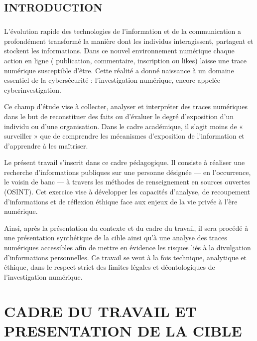 \documentclass[memoire,12pt]{report}
\begin{document}
\section*{INTRODUCTION}
\paragraph{}
L'évolution rapide des technologies de l'information et de la communication a profondément transformé la manière dont les individus interagissent, partagent et stockent les informations. Dans ce nouvel environnement numérique chaque action en ligne ( publication, commentaire, inscription ou likes) laisse une trace numérique susceptible d'être. Cette réalité a donné naissance à un domaine essentiel de la cybersécurité : l’investigation numérique, encore appelée cyberinvestigation.

Ce champ d’étude vise à collecter, analyser et interpréter des traces numériques dans le but de reconstituer des faits ou d’évaluer le degré d’exposition d’un individu ou d’une organisation. Dans le cadre académique, il s’agit moins de « surveiller » que de comprendre les mécanismes d’exposition de l’information et d’apprendre à les maîtriser.

Le présent travail s’inscrit dans ce cadre pédagogique. Il consiste à réaliser une recherche d’informations publiques sur une personne désignée — en l’occurrence, le voisin de banc — à travers les méthodes de renseignement en sources ouvertes (OSINT). Cet exercice vise à développer les capacités d’analyse, de recoupement d’informations et de réflexion éthique face aux enjeux de la vie privée à l’ère numérique.

Ainsi, après la présentation du contexte et du cadre du travail, il sera procédé à une présentation synthétique de la cible ainsi qu’à une analyse des traces numériques accessibles afin de mettre en évidence les risques liés à la divulgation d’informations personnelles. Ce travail se veut à la fois technique, analytique et éthique, dans le respect strict des limites légales et déontologiques de l’investigation numérique.
\newpage
\chapter{CADRE DU TRAVAIL ET PRESENTATION DE LA CIBLE}
\end{document}

